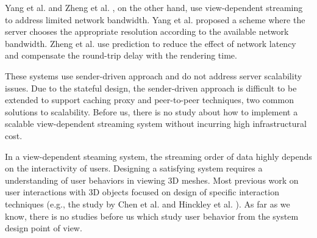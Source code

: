 \documentclass[11pt, a4paper]{report}
\begin{document}
    Yang et al. \cite{progressive:Yang} and
    Zheng et al. \cite{zheng:interactive}, on the other hand, use
    view-dependent streaming to address limited network bandwidth.
    Yang et al. proposed a scheme where the server chooses the appropriate resolution
    according to the available network bandwidth.
    Zheng et al. \cite{zheng:interactive} use prediction to
    reduce the effect of network latency and 
    compensate the round-trip delay with the rendering time.
     
    These systems use sender-driven approach and do not address
    server scalability issues. Due to the stateful design, 
    the sender-driven approach is difficult to be extended to
    support caching proxy and peer-to-peer techniques, two 
    common solutions to scalability. Before us, there is no study about
    how to implement a scalable 
    view-dependent streaming system without incurring high infrastructural cost.

    In a view-dependent steaming system, the streaming order of data highly
    depends on the interactivity of users. Designing a satisfying system
    requires a understanding of user behaviors in viewing 3D meshes.
    Most previous work on user interactions with 3D objects focused on design
    of specific interaction techniques (e.g., the study by Chen et al. \cite{chen88study}
    and Hinckley et al. \cite{hinckley97usability}). 
    As far as we know, there is no studies before us which study user behavior
    from the system design point of view.
    
\end{document}
